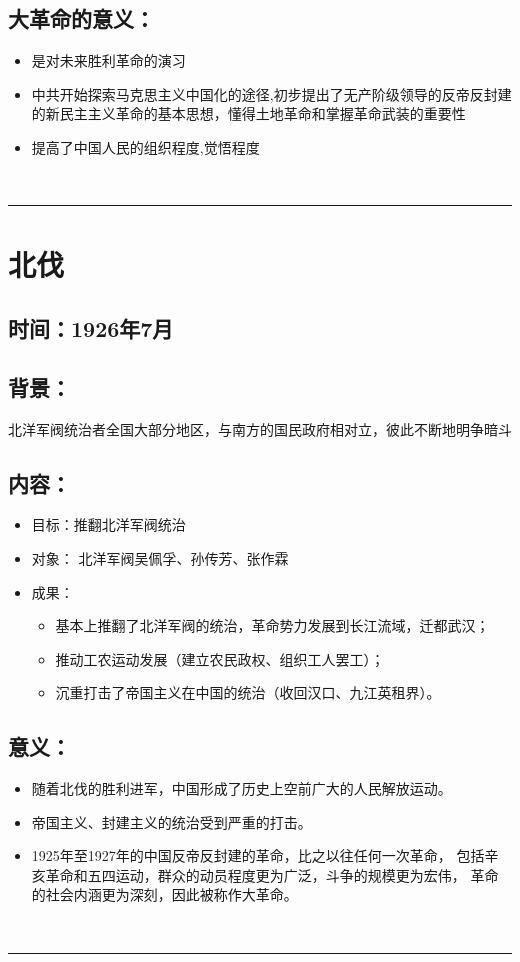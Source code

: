 \documentclass{article}
\begin{document}
\subsection*{大革命的意义：}
\begin{itemize}
	\item 是对未来胜利革命的演习
	\item 中共开始探索马克思主义中国化的途径,初步提出了无产阶级领导的反帝反封建的新民主主义革命的基本思想，懂得土地革命和掌握革命武装的重要性
	\item 提高了中国人民的组织程度,觉悟程度
\end{itemize}
\ \hrule

\section*{北伐}
\subsection*{时间：1926年7月}
\subsection*{背景：}
\noindent 北洋军阀统治者全国大部分地区，与南方的国民政府相对立，彼此不断地明争暗斗
\subsection*{内容：}
\begin{itemize}
    \item 目标：推翻北洋军阀统治
    \item 对象： 北洋军阀吴佩孚、孙传芳、张作霖
    \item 成果： 
    \begin{itemize}
    	\item 基本上推翻了北洋军阀的统治，革命势力发展到长江流域，迁都武汉；
    \item  推动工农运动发展（建立农民政权、组织工人罢工）；
    \item 沉重打击了帝国主义在中国的统治（收回汉口、九江英租界）。
    \end{itemize}
\end{itemize}
\subsection*{意义：}
\begin{itemize}
    \item 随着北伐的胜利进军，中国形成了历史上空前广大的人民解放运动。
    \item 帝国主义、封建主义的统治受到严重的打击。
    \item 1925年至1927年的中国反帝反封建的革命，比之以往任何一次革命，
    包括辛亥革命和五四运动，群众的动员程度更为广泛，斗争的规模更为宏伟，
    革命的社会内涵更为深刻，因此被称作大革命。
\end{itemize}
\ \hrule
\end{document}
